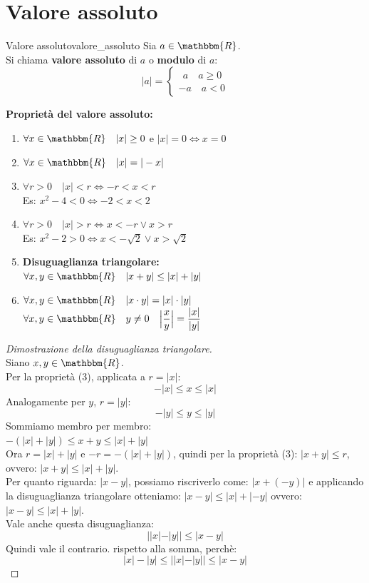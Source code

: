\documentclass[12pt]{report}
\newcounter{definition}
\newcommand{\nmu}{}
\begin{document}
	\chapter{Valore assoluto}
	\begin{definition}{\nmu Valore assoluto}{valore_assoluto}
		Sia $a \in \mathbbm{R}$. \\
		Si chiama \textbf{valore assoluto} di $a$ o \textbf{modulo} di $a$:
		\[
		|a| = \begin{cases}
			\ \ a \quad a \geq 0 \\
			-a \quad a < 0
		\end{cases}
		\]
	\end{definition}
	\textbf{Proprietà del valore assoluto:}
	\begin{enumerate}
		\item $\forall x \in \mathbbm{R} \quad |x| \geq 0$ e $|x| = 0 \iff x = 0$
		\item $\forall x \in \mathbbm{R} \quad |x| = |-x|$
		\item $\forall r > 0 \quad |x| < r \iff -r < x < r$ \\
		Es: $x^2 - 4 < 0 \iff -2 < x < 2$
		\item $\forall r > 0 \quad |x| > r \iff x < -r  \vee  x > r$ \\
		Es: $x^2 - 2 > 0 \iff x < -\sqrt{2} \vee x > \sqrt{2}$
		\item \textbf{Disuguaglianza triangolare:} \\
		$\forall x, y \in \mathbbm{R} \quad |x + y| \leq |x| + |y|$
		\item $\forall x, y \in \mathbbm{R} \quad |x \cdot y| = |x| \cdot |y|$ \\
		$\forall x,y \in \mathbbm{R} \quad y \neq 0 \quad \Big|\dfrac{x}{y}\Big| = \dfrac{|x|}{|y|}$
	\end{enumerate}
	\begin{proof}[Dimostrazione della disuguaglianza triangolare] \quad \\
		Siano $x, y \in \mathbbm{R}$. \\
		Per la proprietà (3), applicata a $r = |x|$:
		\[
		-|x| \leq x \leq |x|
		\]
		Analogamente per $y$, $r = |y|$:
		\[
		-|y| \leq y \leq |y|
		\]
		Sommiamo membro per membro: \\
		$-(|x| + |y|) \leq x + y \leq |x| + |y|$ \\
		Ora $r = |x| + |y|$ e $-r = -(|x| + |y|)$, quindi per la proprietà (3): $|x + y| \leq r$, ovvero: $|x + y| \leq |x| + |y|$. \\
		Per quanto riguarda: $|x - y|$, possiamo riscriverlo come: $|x + (-y)|$ e applicando la disuguaglianza triangolare otteniamo: $|x - y| \leq |x| + |-y|$ ovvero: $|x - y| \leq |x| + |y|$. \\
		Vale anche questa disuguaglianza:
		\[
		||x| - |y|| \leq |x - y|
		\]
		Quindi vale il contrario. rispetto alla somma, perchè:
		\[
		|x| - |y| \leq ||x| - |y|| \leq |x-y|
		\]
	\end{proof}
\end{document}
